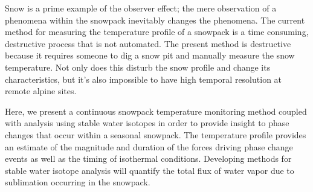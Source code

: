 Snow is a prime example of the observer effect; the mere observation of a phenomena within the snowpack inevitably changes the phenomena. The current method for measuring the temperature profile of a snowpack is a time consuming, destructive process that is not automated. The present method is destructive because it requires someone to dig a snow pit and manually measure the snow temperature. Not only does this disturb the snow profile and change its characteristics, but it’s also impossible to have high temporal resolution at remote alpine sites.

Here, we present a continuous snowpack temperature monitoring method coupled with analysis using stable water isotopes in order to provide insight to phase changes that occur within a seasonal snowpack. The temperature profile provides an estimate of the magnitude and duration of the forces driving phase change events as well as the timing of isothermal conditions. Developing methods for stable water isotope analysis will quantify the total flux of water vapor due to sublimation occurring in the snowpack.

